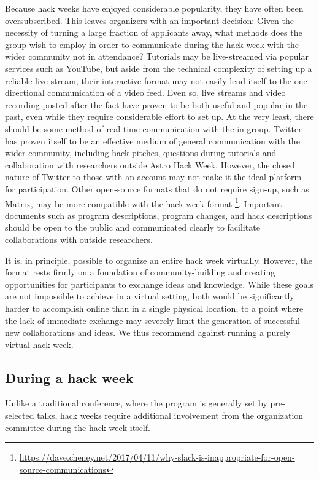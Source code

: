 \documentclass{aastex62}
\begin{document}
Because hack weeks have enjoyed considerable popularity, they have often been oversubscribed. This leaves organizers with an important decision: Given the necessity of turning a large fraction of applicants away, what methods does the group wish to employ in order to communicate during the hack week with the wider community not in attendance? Tutorials may be live-streamed via popular services such as YouTube, but aside from the technical complexity of setting up a reliable live stream, their interactive format may not easily lend itself to the one-directional communication of a video feed. Even so, live streams and video recording posted after the fact have proven to be both useful and popular in the past, even while they require considerable effort to set up. At the very least, there should be some method of real-time communication with the in-group. Twitter has proven itself to be an effective medium of general communication with the wider community, including hack pitches, questions during tutorials and collaboration with researchers outside Astro Hack Week. However, the closed nature of Twitter to those with an account may not make it the ideal platform for participation. Other open-source formats that do not require sign-up, such as Matrix, may be more compatible with the hack week format \footnote{\url{https://dave.cheney.net/2017/04/11/why-slack-is-inappropriate-for-open-source-communications}}. Important documents such as program descriptions, program changes, and hack descriptions should be open to the public and communicated clearly to facilitate collaborations with outside researchers.

It is, in principle, possible to organize an entire hack week virtually. However, the format rests firmly on a foundation of community-building and creating opportunities for participants to exchange ideas and knowledge. While these goals are not impossible to achieve in a virtual setting, both would be significantly harder to accomplish online than in a single physical location, to a point where the lack of immediate exchange may severely limit the generation of successful new collaborations and ideas. We thus recommend against running a purely virtual hack week.

\clearpage
\subsection{During a hack week}

Unlike a traditional conference, where the program is generally set by pre-selected talks, hack weeks require additional involvement from the organization committee during the hack week itself.
\end{document}
